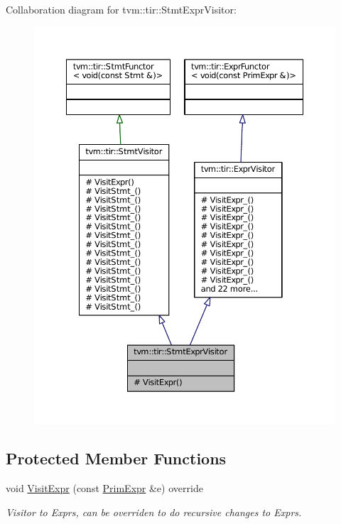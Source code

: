 Collaboration diagram for tvm\+:\+:tir\+:\+:Stmt\+Expr\+Visitor\+:
\nopagebreak
\begin{figure}[H]
\begin{center}
\leavevmode
\includegraphics[width=350pt]{classtvm_1_1tir_1_1StmtExprVisitor__coll__graph}
\end{center}
\end{figure}
\subsection*{Protected Member Functions}
\begin{DoxyCompactItemize}
\item 
void \hyperlink{classtvm_1_1tir_1_1StmtExprVisitor_a21d7f30350a7aa02cdc0c1b5ee3ffa23}{Visit\+Expr} (const \hyperlink{classtvm_1_1PrimExpr}{Prim\+Expr} \&e) override
\begin{DoxyCompactList}\small\item\em Visitor to Exprs, can be overriden to do recursive changes to Exprs. \end{DoxyCompactList}\end{DoxyCompactItemize}


